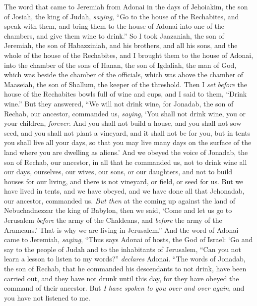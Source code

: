 \begin{biblechapter} %
 The word that came to Jeremiah from Adonai in the days of Jehoiakim, the son of Josiah, the king of Judah, \textit{saying},
\verse “Go to the house of the Rechabites, and speak with them, and bring them to the house of Adonai into one of the chambers, and give them wine to drink.”
\verse So I took Jaazaniah, the son of Jeremiah, the son of Habazziniah, and his brothers, and all his sons, and the whole of the house of the Rechabites,
\verse and I brought them to the house of Adonai, into the chamber of the sons of Hanan, the son of Igdaliah, the man of God, which was beside the chamber of the officials, which was above the chamber of Maaseiah, the son of Shallum, the keeper of the threshold.
\verse Then I \textit{set} \textit{before} the house of the Rechabites bowls full of wine and cups, and I said to them, “Drink wine.”
\verse But they answered, “We will not drink wine, for Jonadab, the son of Rechab, our ancestor, commanded us, \textit{saying}, ‘You shall not drink wine, you or your children, \textit{forever}.
\verse And you shall not build a house, and you shall not sow seed, and you shall not plant a vineyard, and it shall not be for you, but in tents you shall live all your days, so that you may live many days on the surface of the land where you are dwelling as aliens.’
\verse And we obeyed the voice of Jonadab, the son of Rechab, our ancestor, in all that he commanded us, not to drink wine all our days, ourselves, our wives, our sons, or our daughters,
\verse and not to build houses for our living, and there is not vineyard, or field, or seed for us.
\verse But we have lived in tents, and we have obeyed, and we have done all that Jehonadab, our ancestor, commanded us.
\verse \textit{But then} at the coming up against the land of Nebuchadnezzar the king of Babylon, then we said, ‘Come and let us go to Jerusalem \textit{before} the army of the Chaldeans, and \textit{before} the army of the Arameans.’ That is why we are living in Jerusalem.”
\verse And the word of Adonai came to Jeremiah, \textit{saying},
\verse “Thus says Adonai of hosts, the God of Israel: ‘Go and say to the people of Judah and to the inhabitants of Jerusalem, “Can you not learn a lesson to listen to my words?” \textit{declares} Adonai.
\verse “The words of Jonadab, the son of Rechab, that he commanded his descendants to not drink, have been carried out, and they have not drunk until this day, for they have obeyed the command of their ancestor. But \textit{I have spoken to you over and over again}, and you have not listened to me.

\end{biblechapter}

